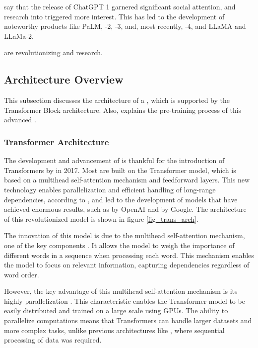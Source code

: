 \citet{liu_prompting_nodate} say that the release of ChatGPT 1 garnered significant social attention, and research into {\llm} triggered more interest. This has led to the development of noteworthy products like PaLM, {\gpt}-2, {\gpt}-3, and, most recently, {\gpt}-4, and LLaMA and LLaMa-2.

{\llm} are revolutionizing {\nlp} and {\ai} research.


\subsection{Architecture Overview}

This subsection discusses the architecture of a {\llm}, which is supported by the Transformer Block architecture. Also, explains the pre-training process of this advanced {\lm}.

\subsubsection{Transformer Architecture}

The development and advancement of {\llm} is thankful for the introduction of Transformers by \citet{vaswani_attention_2023} in 2017. Most {\llm} are built on the Transformer model, which is based on a multihead self-attention mechanism and feedforward layers. This new technology enables parallelization and efficient handling of long-range dependencies, according to \citet{hadi_LLM_2023}, and led to the development of models that have achieved enormous results, such as {\gpt} by OpenAI and {\bert} by Google. The architecture of this revolutionized model is shown in figure \ref{fig_trans_arch}.

The innovation of this model is due to the multihead self-attention mechanism, one of the key components \cite{vaswani_attention_2023} \cite{hadi_LLM_2023}. It allows the model to weigh the importance of different words in a sequence when processing each word. This mechanism enables the model to focus on relevant information, capturing dependencies regardless of word order. 

However, the key advantage of this multihead self-attention mechanism is its highly parallelization \cite{vaswani_attention_2023}. This characteristic enables the Transformer model to be easily distributed and trained on a large scale using GPUs. The ability to parallelize computations means that Transformers can handle larger datasets and more complex tasks, unlike previous architectures like {\rnn}, where sequential processing of data was required.


